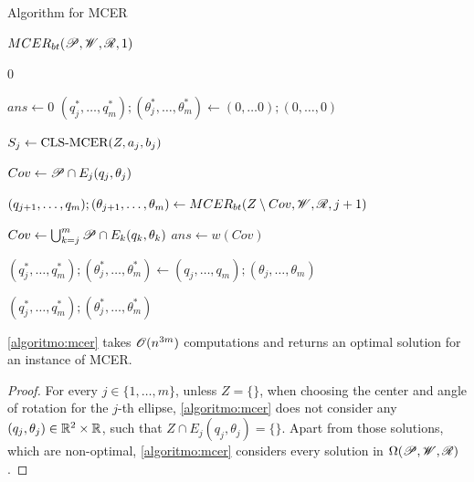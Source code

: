 \begin{algoritmo}
	\caption{Algorithm for MCER}\label{algoritmo:mcer}
	\begin{algorithmic}[1]
		
		
		\item[]
		\State \Return $MCER_{bt}(\mathscr{P}, \mathscr{W}, \mathscr{R}, 1)$
		\EndProcedure
		
		\item[]
		
		\State \Return $0$
		\EndIf
		
		\State $ans \gets 0$
		\State $(q_{j}^*, \dots, q_m^*); (\theta_{j}^*, \dots, \theta_m^*) \gets (0, \dots 0); (0, \dots, 0)$ 
		
		\State $S_j \gets \textnormal{CLS-MCER}(Z, a_j, b_j)$

		
		\State $Cov \gets \mathscr{P} \cap E_j(q_j, \theta_j)$
		
		\State $(q_{j+1}, \dots, q_m); (\theta_{j+1}, \dots, \theta_m) \gets  MCER_{bt}(Z\setminus Cov, \mathscr{W}, \mathscr{R}, j+1)$
		
		
		\State $Cov \gets \bigcup_{k=j}^m \mathscr{P} \cap E_k(q_k, \theta_k)$
			\State $ans \gets w(Cov)$
			
			\State $(q_{j}^*, \dots, q_m^*); (\theta_{j}^*, \dots, \theta_m^*) \gets (q_{j}, \dots, q_m); (\theta_{j}, \dots, \theta_m)$
		\EndIf
		\EndFor
		
		\State \Return $(q_{j}^*, \dots, q_m^*); (\theta_{j}^*, \dots, \theta_m^*)$
		\EndProcedure
	\end{algorithmic}
\end{algoritmo}

\begin{corolario}
	\autoref{algoritmo:mcer} takes $\mathscr{O}(n^{3m})$ computations and returns an optimal solution for an instance of MCER.
\end{corolario}

\begin{proof}
	For every $j\in\{1, \dots, m\}$, unless $Z=\{\}$, when choosing the center and angle of rotation for the $j$-th ellipse, \autoref{algoritmo:mcer} does not consider any $(q_j, \theta_j) \in \mathbb{R}^2 \times \mathbb{R}$, such that $Z \cap E_j(q_j, \theta_j) = \{\}$. Apart from those solutions, which are non-optimal, \autoref{algoritmo:mcer} considers every solution in $\Omega(\mathscr{P}, \mathscr{W}, \mathscr{R})$.
\end{proof}

